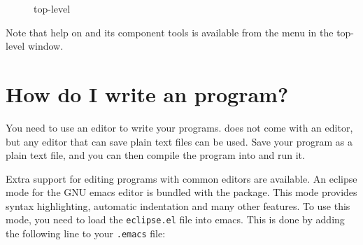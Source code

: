 \begin{figure}[bt]
\begin{center}
\end{center}
\caption{{\tkeclipse} top-level}
\label{tktop}
\end{figure}

Note that help on {\tkeclipse} and its component tools is available
from the  menu in the top-level window.

\section{How do I write an {\eclipse} program?}
You need to use an editor to write your programs. {\eclipse} does not come
with an editor, but any editor that can save plain text files can be used. 
Save your program as a plain text file, and you can then compile the
program into {\eclipse} and run it.

Extra support for editing {\eclipse} programs with common editors are
available. An eclipse mode for the GNU emacs editor is bundled with the
{\eclipse} package. This mode provides syntax highlighting, automatic
indentation and many other features. To use this mode, you need to load the
\texttt{eclipse.el} file into emacs. This is done by adding the following
line to your \texttt{.emacs} file:

